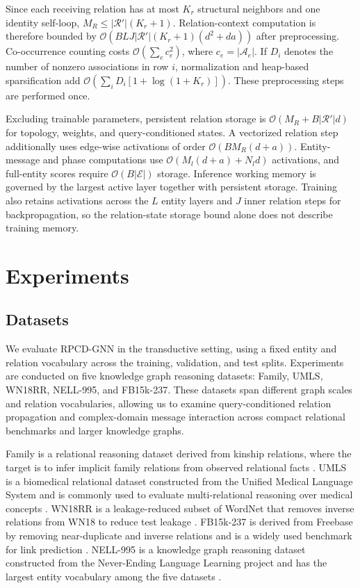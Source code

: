 \documentclass[a4paper,fleqn]{cas-dc}
\begin{document}
Since each receiving relation has at most $K_r$ structural neighbors and one identity self-loop, $M_R\leq|\mathcal{R}'|(K_r+1)$. Relation-context computation is therefore bounded by $\mathcal{O}(BLJ|\mathcal{R}'|(K_r+1)(d^2+da))$ after preprocessing. Co-occurrence counting costs $\mathcal{O}(\sum_e c_e^2)$, where $c_e=|\mathcal{A}_e|$. If $D_i$ denotes the number of nonzero associations in row $i$, normalization and heap-based sparsification add $\mathcal{O}(\sum_i D_i[1+\log(1+K_r)])$. These preprocessing steps are performed once.

Excluding trainable parameters, persistent relation storage is $\mathcal{O}(M_R+B|\mathcal{R}'|d)$ for topology, weights, and query-conditioned states. A vectorized relation step additionally uses edge-wise activations of order $\mathcal{O}(BM_R(d+a))$. Entity-message and phase computations use $\mathcal{O}(M_l(d+a)+N_ld)$ activations, and full-entity scores require $\mathcal{O}(B|\mathcal{E}|)$ storage. Inference working memory is governed by the largest active layer together with persistent storage. Training also retains activations across the $L$ entity layers and $J$ inner relation steps for backpropagation, so the relation-state storage bound alone does not describe training memory.

\section{Experiments}\label{sec:experiments}

\subsection{Datasets}\label{subsec:datasets}

We evaluate RPCD-GNN in the transductive setting, using a fixed entity and relation vocabulary across the training, validation, and test splits. Experiments are conducted on five knowledge graph reasoning datasets: Family, UMLS, WN18RR, NELL-995, and FB15k-237. These datasets span different graph scales and relation vocabularies, allowing us to examine query-conditioned relation propagation and complex-domain message interaction across compact relational benchmarks and larger knowledge graphs.

Family is a relational reasoning dataset derived from kinship relations, where the target is to infer implicit family relations from observed relational facts \citep{Kok2007Statistical,Sadeghian2019DRUM}. UMLS is a biomedical relational dataset constructed from the Unified Medical Language System and is commonly used to evaluate multi-relational reasoning over medical concepts \citep{Bodenreider2004UMLS,Sadeghian2019DRUM}. WN18RR is a leakage-reduced subset of WordNet that removes inverse relations from WN18 to reduce test leakage \citep{Dettmers2018ConvE}. FB15k-237 is derived from Freebase by removing near-duplicate and inverse relations and is a widely used benchmark for link prediction \citep{Toutanova2015Observed,Dettmers2018ConvE}. NELL-995 is a knowledge graph reasoning dataset constructed from the Never-Ending Language Learning project and has the largest entity vocabulary among the five datasets \citep{Xiong2017DeepPath}.
\end{document}
